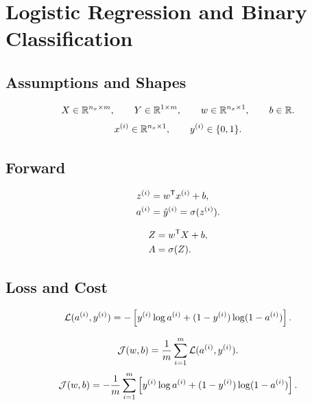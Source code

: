 \section{Logistic Regression and Binary Classification}

\subsection{Assumptions and Shapes}

\[
X \in \mathbb{R}^{n_x \times m},
\qquad
Y \in \mathbb{R}^{1 \times m},
\qquad
w \in \mathbb{R}^{n_x \times 1},
\qquad
b \in \mathbb{R}.
\]
\[
x^{(i)} \in \mathbb{R}^{n_x \times 1},
\qquad
y^{(i)} \in \{0,1\}.
\]

\subsection{Forward}

\[
\begin{aligned}
z^{(i)} &= w^{\mathsf{T}} x^{(i)} + b,\\
a^{(i)} &= \hat{y}^{(i)} = \sigma(z^{(i)}).
\end{aligned}
\]

\[
\begin{aligned}
Z &= w^{\mathsf{T}} X + b,\\
A &= \sigma(Z).
\end{aligned}
\]

\subsection{Loss and Cost}

\[
\mathcal{L}(a^{(i)}, y^{(i)})
=
-\left[
y^{(i)}\log a^{(i)}
+
(1-y^{(i)})\log(1-a^{(i)})
\right].
\]

\[
\mathcal{J}(w,b)
=
\frac{1}{m}
\sum_{i=1}^{m}
\mathcal{L}(a^{(i)}, y^{(i)}).
\]
\[
\mathcal{J}(w,b)
=
-\frac{1}{m}
\sum_{i=1}^{m}
\left[
y^{(i)}\log a^{(i)}
+
(1-y^{(i)})\log(1-a^{(i)})
\right].
\]

